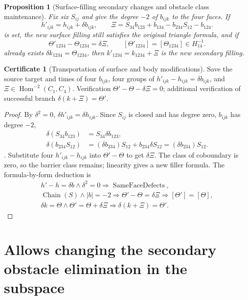 \documentclass[12pt,a4paper,openany,notitlepage]{report}
\theoremstyle{plain}
\newtheorem{proposition}[theorem]{Proposition}
\theoremstyle{definition}
\newtheorem*{certificate}{Certificate}
\theoremstyle{remark}
\begin{document}
\begin{CJK*}
\begin{proposition}
[Surface-filling secondary changes and obstacle class maintenance]\label{exp:hom:secondary-invariance}
Fix six $S_{ij}$ and give the degree $-2$ of $b_{ijk}$ to the four faces. If \[
 h'_{ijk}=h_{ijk}+\delta b_{ijk},\qquad
 \Xi=S_{34}b_{123}+b_{134}-b_{234}S_{12}-b_{124}.
\] is set, the new surface filling still satisfies the original triangle formula, and if \[
 \Theta'_{1234}-\Theta_{1234}=\delta\Xi,
 \qquad [\Theta'_{1234}]=[\Theta_{1234}]\in H^{-1}_{14}.
\] already exists $\delta k_{1234}=\Theta_{1234}$, then $k'_{1234}=k_{1234}+\Xi$ is the new secondary filling.\end{proposition}
\begin{certificate}
[Transportation of surface and body modifications]Save the source target and times of four $b_{ijk}$, four groups of $h'_{ijk}-h_{ijk}=\delta b_{ijk}$, and $\Xi\in\operatorname{Hom}^{-2}(C_1,C_4)$. Verification $\Theta'-\Theta-\delta\Xi=0$; additional verification of successful branch $\delta(k+\Xi)=\Theta'$.\end{certificate}
\begin{proof}
By $\delta^2=0$, $\delta h'_{ijk}=\delta h_{ijk}$. Since $S_{ij}$ is closed and has degree zero, $b_{ijk}$ has degree $-2$, \[
 \begin{aligned}
 \delta(S_{34}b_{123})&=S_{34}\delta b_{123},\\
 \delta(b_{234}S_{12})&=(\delta b_{234})S_{12}
                       +b_{234}\delta S_{12}
                      =(\delta b_{234})S_{12}.
 \end{aligned}
\]. Substitute four $h'_{ijk}-h_{ijk}$ into $\Theta'-\Theta$ to get $\delta\Xi$. The class of coboundary is zero, so the barrier class remains; linearity gives a new filler formula. The formula-by-form deduction is \[
 \begin{gathered}
 h'-h=\delta b\land\delta^2=0
 \Rightarrow\operatorname{SameFaceDefects},\\
 \operatorname{Chain}(S)\land|b|=-2
 \Rightarrow\Theta'-\Theta=\delta\Xi
 \Rightarrow[\Theta']=[\Theta],\\
 \delta k=\Theta\land\Theta'=\Theta+\delta\Xi
 \Rightarrow\delta(k+\Xi)=\Theta'.
 \end{gathered}
\]\end{proof}


\section { Allows changing the secondary obstacle elimination in the subspace }\label{exp:hom:allowed-face-variations}



\end{CJK*}
\end{document}
